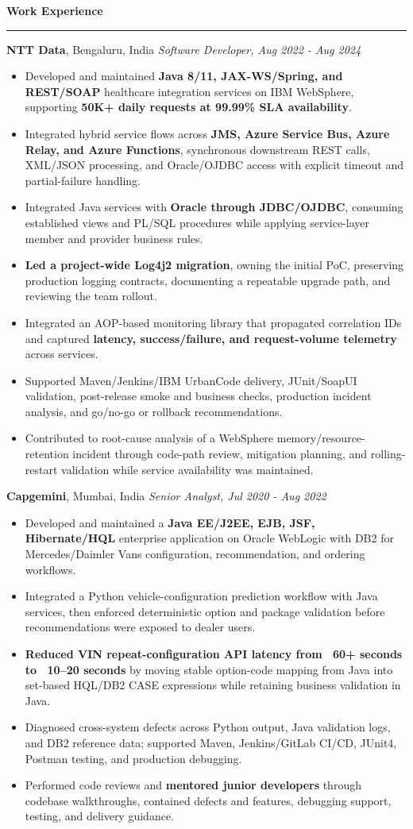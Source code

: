 \documentclass[11pt,letterpaper]{article}
\newcommand{\ressection}[1]{\Needspace{6\baselineskip}\vspace{8pt}\par\textbf{#1}\par\vspace{2pt}\hrule\vspace{5pt}}
\begin{document}
\ressection{Work Experience}
\textbf{NTT Data}, Bengaluru, India \hfill \textit{Software Developer, Aug 2022 - Aug 2024}
\begin{itemize}
  \item Developed and maintained \textbf{Java 8/11, JAX-WS/Spring, and REST/SOAP} healthcare integration services on IBM WebSphere, supporting \textbf{50K+ daily requests at 99.99\% SLA availability}.
  \item Integrated hybrid service flows across \textbf{JMS, Azure Service Bus, Azure Relay, and Azure Functions}, synchronous downstream REST calls, XML/JSON processing, and Oracle/OJDBC access with explicit timeout and partial-failure handling.
  \item Integrated Java services with \textbf{Oracle through JDBC/OJDBC}, consuming established views and PL/SQL procedures while applying service-layer member and provider business rules.
  \item \textbf{Led a project-wide Log4j2 migration}, owning the initial PoC, preserving production logging contracts, documenting a repeatable upgrade path, and reviewing the team rollout.
  \item Integrated an AOP-based monitoring library that propagated correlation IDs and captured \textbf{latency, success/failure, and request-volume telemetry} across services.
  \item Supported Maven/Jenkins/IBM UrbanCode delivery, JUnit/SoapUI validation, post-release smoke and business checks, production incident analysis, and go/no-go or rollback recommendations.
  \item Contributed to root-cause analysis of a WebSphere memory/resource-retention incident through code-path review, mitigation planning, and rolling-restart validation while service availability was maintained.
\end{itemize}
\textbf{Capgemini}, Mumbai, India \hfill \textit{Senior Analyst, Jul 2020 - Aug 2022}
\begin{itemize}
  \item Developed and maintained a \textbf{Java EE/J2EE, EJB, JSF, Hibernate/HQL} enterprise application on Oracle WebLogic with DB2 for Mercedes/Daimler Vans configuration, recommendation, and ordering workflows.
  \item Integrated a Python vehicle-configuration prediction workflow with Java services, then enforced deterministic option and package validation before recommendations were exposed to dealer users.
  \item \textbf{Reduced VIN repeat-configuration API latency from ~60+ seconds to ~10--20 seconds} by moving stable option-code mapping from Java into set-based HQL/DB2 CASE expressions while retaining business validation in Java.
  \item Diagnosed cross-system defects across Python output, Java validation logs, and DB2 reference data; supported Maven, Jenkins/GitLab CI/CD, JUnit4, Postman testing, and production debugging.
  \item Performed code reviews and \textbf{mentored junior developers} through codebase walkthroughs, contained defects and features, debugging support, testing, and delivery guidance.
\end{itemize}
\end{document}
